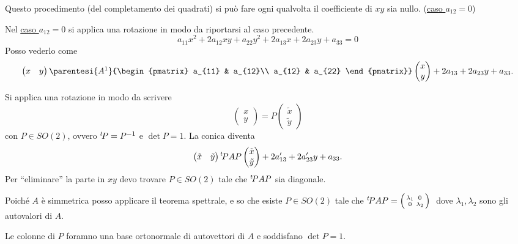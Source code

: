 Questo procedimento (del completamento dei quadrati) si può fare ogni qualvolta il coefficiente di $ xy $ sia nullo. (\underline{caso $ a_{12}=0 $})

Nel \underline{caso $ a_{12}=0$} si applica una rotazione in modo da riportarsi al caso precedente.
\[
    a_{11} x^{2} + 2 a_{12} xy + a_{22}y^{2} + 2 a_{13}x + 2 a_{23} y + a_{33}=0
\]
Posso vederlo come \[
    \begin{pmatrix}
        x & y
    \end{pmatrix}\parentesi{A\footnotemark}{\begin{pmatrix}
        a_{11} & a_{12}\\
        a_{12} & a_{22}
    \end{pmatrix}}\begin{pmatrix}
        x\\y
    \end{pmatrix} + 2a_{13}+2a_{23}y+a_{33}.
\]

Si applica una rotazione in modo da scrivere \[
    \begin{pmatrix}
        x\\ y
    \end{pmatrix} = P \begin{pmatrix}
        \tilde{x}\\ \tilde{y}
    \end{pmatrix}
\] con $ P \in SO(2) $, ovvero $ \null^{t}\!P=P^{-1} $ e $ \det P =1 $. La conica diventa
\[
    \begin{pmatrix}
        \tilde{x} & \tilde{y}
    \end{pmatrix}\null^{t}\!P A P\begin{pmatrix}
        \tilde{x}\\\tilde{y}
    \end{pmatrix} + 2a_{13}'+2a_{23}'y+a_{33}.
\] 
Per ``eliminare'' la parte in $ xy $ devo trovare $ P \in SO(2) $ tale che $ \null^{t}\!PAP $ sia diagonale.

Poiché $ A $ è simmetrica posso applicare il teorema spettrale, e so che esiste $ P \in SO(2) $ tale che $ \null^{t}\!P A P =\Bigl(\begin{smallmatrix}
    \lambda_1 & 0\\
    0 & \lambda_2
\end{smallmatrix}\Bigr)\ $ dove $ \lambda_1, \lambda_2  $ sono gli autovalori di $ A$. 

Le colonne di $ P $ foramno una base ortonormale di autovettori di $ A $ e soddisfano $ \det P = 1 $.

    
